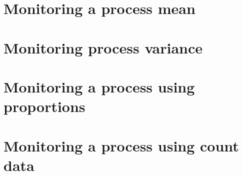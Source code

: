 \section{Monitoring a process mean} 
 
\section{Monitoring process variance} 
 
\section{Monitoring a process using proportions} 
 
 
\section{Monitoring a process using count data} 
 


